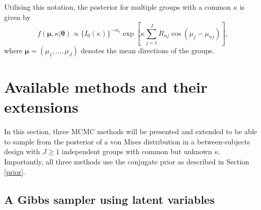 \documentclass[]{gSCS2e}
\theoremstyle{plain}
\theoremstyle{definition}
\theoremstyle{remark}
\begin{document}
Utilising this notation, the posterior for multiple groups with a common $\kappa$ is given by $$f(\boldsymbol{\mu}, \kappa \vert \boldsymbol\theta) \propto \{I_0 (\kappa) \}^{-m_t} \exp \left[ \kappa \sum_{j=1}^{J} R_{nj} \cos (\mu_j - \mu_{nj})\right], $$ where $\boldsymbol{\mu} = (\mu_{1}, \dots, \mu_{J})$ denotes the mean directions of the groups. 


\section{Available methods and their extensions \label{methods}}

In this section, three MCMC methods will be presented and extended to be able to sample from the posterior of a von Mises distribution in a between-subjects design with $J \geq 1$ independent groups with common but unknown $\kappa$. Importantly, all three methods use the conjugate prior as described in Section \ref{prior}. %


\subsection{A Gibbs sampler using latent variables  \label{dw}}
\end{document}
